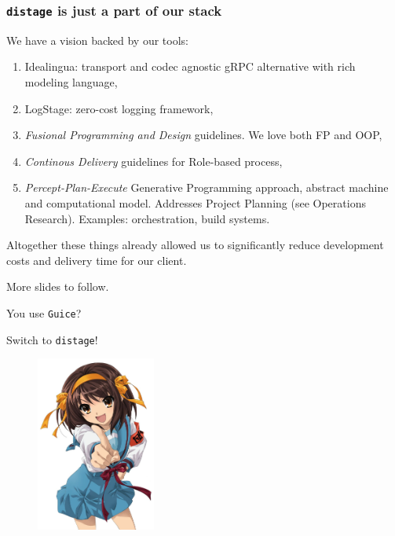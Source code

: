 \documentclass[usenames,dvipsnames]{beamer}
\newcommand{\distage}{\texttt{distage}\xspace}
\begin{document}
\begin{frame}
  \frametitle{\distage is just a part of our stack}
  We have a vision backed by our tools:
  \begin{enumerate}
    \item Idealingua: transport and codec agnostic gRPC alternative with rich modeling language,
    \item LogStage: zero-cost logging framework,
    \item \textit{Fusional Programming and Design} guidelines. We love both FP and OOP,
    \item \textit{Continous Delivery} guidelines for Role-based process,
    \item \textit{Percept-Plan-Execute} Generative Programming approach, abstract machine and computational model.
    Addresses Project Planning (see Operations Research). Examples: orchestration, build systems.
  \end{enumerate}

  Altogether these things already allowed us to significantly reduce development costs and
  delivery time for our client.\newline

  More slides to follow.
\end{frame}

\begin{frame}
  \begin{center}
  \Huge
  You use \texttt{Guice}?

  Switch to \distage!

  \begin{figure}
      \includegraphics[width=0.35\textwidth]{media/haruhi.jpg}
  \end{figure}

  \end{center}
\end{frame}
\end{document}
